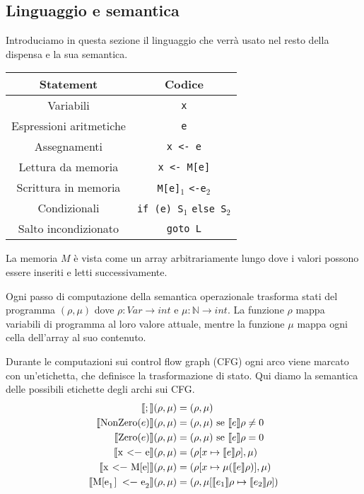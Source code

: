 \documentclass[a4paper, 10pt]{article}
\newcommand{\code}[1]{\textup{\lstinline{#1}}}
\newcommand{\sem}[1]{\llbracket #1 \rrbracket (\rho, \mu)}
\begin{document}
	\subsection{Linguaggio e semantica}
	Introduciamo in questa sezione il linguaggio che verrà usato nel resto della dispensa e la sua semantica.
	\begin{center}
			\begin{tabular}{cc}
			\hline
			\textbf{Statement} & \textbf{Codice} \\
			\hline
			\hline
			Variabili & \lstinline|x| \\
			Espressioni aritmetiche & \lstinline|e| \\
			Assegnamenti & \lstinline|x <- e| \\
			Lettura da memoria & \lstinline|x <- M[e]| \\
			Scrittura in memoria & \lstinline|M[e]|$_1$ \lstinline|<-e|$_2$ \\
			Condizionali & \lstinline|if (e) S|$_1$ \lstinline|else S|$_2$ \\
			Salto incondizionato & \lstinline|goto L|\\
			\hline
		\end{tabular}
	\end{center}

	La memoria $M$ è vista come un array arbitrariamente lungo dove i valori possono essere inseriti e letti successivamente.
	
	Ogni passo di computazione della semantica operazionale trasforma stati del programma $(\rho, \mu)$ dove $\rho: Var \to int$ e $\mu : \mathbb{N} \to int$. La funzione $\rho$ mappa variabili di programma al loro valore attuale, mentre la funzione $\mu$ mappa ogni cella dell'array al suo contenuto.
	
	Durante le computazioni sui control flow graph (CFG) ogni arco viene marcato con un'etichetta, che definisce la trasformazione di stato. Qui diamo la semantica delle possibili etichette degli archi sui CFG.
	\begin{align*}
		\sem{;} &= (\rho, \mu) \\
		\sem{\code{NonZero}(e)} &= (\rho, \mu) \text{ se } \llbracket e \rrbracket \rho \neq 0 \\
		\sem{\code{Zero}(e)} &= (\rho, \mu) \text{ se } \llbracket e \rrbracket \rho = 0 \\
		\sem{\code{x <- e}} &= (\rho \lbrack x \mapsto \llbracket e \rrbracket \rho \rbrack, \mu)  \\
		\sem{\code{x <- M[e]}} &= (\rho \lbrack x \mapsto \mu(\llbracket e \rrbracket \rho) \rbrack, \mu)  \\
		\sem{\code{M[e}_1\code{] <- e}_2} &= (\rho, \mu\lbrack \llbracket e_1 \rrbracket \rho \mapsto \llbracket e_2 \rrbracket \rho \rbrack)
	\end{align*}
	
\end{document}
